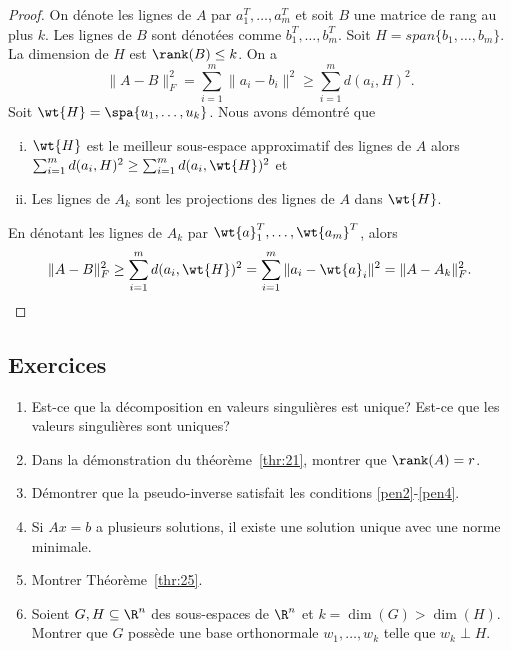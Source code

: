 \begin{proof}
On dénote les lignes de $A$ par $a_1^T,\dots,a_m^T$ et soit $B$ une matrice de rang au plus $k$. Les lignes de $B$ sont dénotées comme $b_1^T,\dots,b_m^T$. Soit $H = span\{b_1,\dots,b_m\}$. La dimension de $H$ est $\rank(B) \leq k$. On a 
\begin{displaymath}
  \|A - B\|_F^2 = \sum_{i=1}^m \|a_i - b_i\|^2 \geq \sum_{i=1}^m d(a_i,H)^2.
\end{displaymath}
Soit $\wt{H} = \spa\{u_1,\dots,u_k\}$. Nous avons démontré que 
\begin{enumerate}[i)]
\item $\wt{H}$ est le meilleur sous-espace approximatif des lignes de $A$ alors $\sum_{i=1}^m d(a_i,H)^2 \geq  \sum_{i=1}^m d(a_i,\wt{H})^2$ et 
\item Les lignes de $A_k$ sont les projections des lignes de $A$ dans $\wt{H}$. 
\end{enumerate}
En dénotant les lignes de $A_k$ par $\wt{a}_1^T,\dots,\wt{a_m}^T$, alors 
\begin{displaymath}
  \|A - B\|_F^2 \geq  \sum_{i=1}^m d(a_i,\wt{H})^2 = \sum_{i=1}^m \|a_i - \wt{a}_i\|^2 = \|A - A_k\|_F^2. 
\end{displaymath}
\end{proof}

\subsection*{Exercices}

\begin{enumerate}
\item Est-ce que la décomposition en valeurs singulières est unique? Est-ce que les valeurs singulières sont uniques?  \label{item:2}
\item  Dans la démonstration du théorème~\ref{thr:21}, montrer que $\rank(A) = r$. 
\item Démontrer que la pseudo-inverse satisfait les conditions \ref{pen2}-\ref{pen4}. 
\item Si $Ax = b$ a plusieurs solutions, il existe une solution unique avec une norme minimale. 
\item Montrer Théorème~\ref{thr:25}. 
\item Soient  $G,H \subseteq \R^n$ des sous-espaces de $\R^n$ 
et $k=\dim(G) > \dim(H)$. Montrer que $G$ possède une base orthonormale $w_1,\dots,w_k$ telle que $w_k \perp H$. \label{item:3}  
\end{enumerate}






